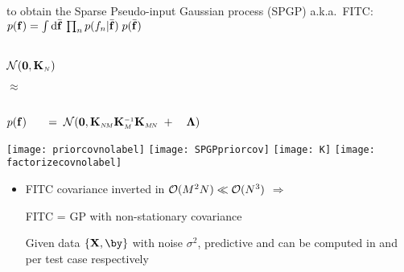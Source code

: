 

\vspace*{-4ex}
\centerline{ }

\vspace*{1.5ex}
 to
obtain the Sparse Pseudo-input Gaussian process (SPGP) a.k.a.\ FITC: 
$p(\mathbf{f}) = \int\mathrm{d}\bar{\mathbf{f}}\,\prod_n p(f_n|\bar{\mathbf{f}})\; p(\bar{\mathbf{f}})$ \\[1ex]

\begin{minipage}[t]{0.2\linewidth}
\\
\centering
$\mathcal{N}(\mathbf{0},\mathbf{K}_{\scriptscriptstyle N})$
\end{minipage}
\begin{minipage}[t]{0.06\linewidth}
\bigskip\medskip
$\approx$
\end{minipage}
\begin{minipage}[t]{0.7\linewidth}
\centering
{}\\
$p(\mathbf{f}) \qquad\!\!=\; \mathcal{N}(\mathbf{0},\mathbf{K}_{\scriptscriptstyle N\! M}\mathbf{K}_{\scriptscriptstyle M}^{\scriptscriptstyle -1}\mathbf{K}_{\scriptscriptstyle M\! N} \;+ \quad\mathbf{\Lambda})$
\end{minipage}
\texttt{[image: priorcovnolabel]} 
\raisebox{65pt}{$\approx$}
\texttt{[image: SPGPpriorcov]}
\raisebox{65pt}{=}
\texttt{[image: K]}
\raisebox{134pt}{\texttt{[image: Kp]}} 
\raisebox{65pt}{+}
\texttt{[image: factorizecovnolabel]}

\begin{itemize}
\item FITC covariance inverted in $\mathcal{O}(M^2N) \ll \mathcal{O}(N^3) $
  $\Rightarrow$ 

\im FITC = GP with non-stationary covariance 

\im Given data $\{\bX,\by\}$ with noise $\sigma^2$, predictive
   and  can be computed in 
  and  per test case respectively

\end{itemize}

